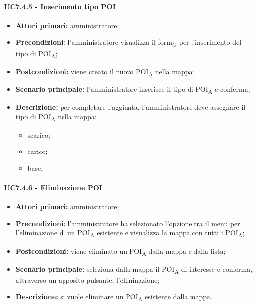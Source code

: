 \paragraph{UC7.4.5 - Inserimento tipo POI}
\begin{itemize}
	\item 	\textbf{Attori primari:} amministratore;
	\item 	\textbf{Precondizioni:} l'amministratore visualizza il form\textsubscript{G} per l'inserimento del tipo di POI\textsubscript{A};
	\item 	\textbf{Postcondizioni:} viene creato il nuovo POI\textsubscript{A} nella mappa; 
	\item 	\textbf{Scenario principale:} l'amministratore inserisce il tipo di POI\textsubscript{A} e conferma;
	\item 	\textbf{Descrizione:} per completare l'aggiunta, l'amministratore deve assegnare il tipo di POI\textsubscript{A} nella mappa:
	\begin{itemize}
		\item scarico;
		\item carico;
		\item base.
	\end{itemize}

\end{itemize}

\paragraph{UC7.4.6 - Eliminazione POI}
\begin{itemize}
	\item 	\textbf{Attori primari:} amministratore;
	\item 	\textbf{Precondizioni:} l'amministratore ha selezionato l'opzione tra il menu per l'eliminazione di un POI\textsubscript{A} esistente e visualizza la mappa con tutti i POI\textsubscript{A};
	\item 	\textbf{Postcondizioni:} viene eliminato un POI\textsubscript{A} dalla mappa e dalla lista; 
	\item 	\textbf{Scenario principale:} seleziona dalla mappa il POI\textsubscript{A} di interesse e conferma, attraverso un apposito pulsante, l'eliminazione;
	\item 	\textbf{Descrizione:} si vuole eliminare un POI\textsubscript{A} esistente dalla mappa.
\end{itemize}
